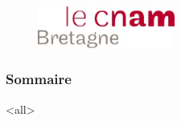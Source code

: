 \documentclass[ignorenonframetext, 8pt, allowframebreaks]{beamer}
\title[\ushorttitle]{\utitle}
\author[\uauthortwitter]{ \uauthor \\ \medskip {\small \url{\umaila} \and \url{\umailb}\\ {\small \url{\usitea}}}}
\institute[\uinstituteshort]{\uinstitute \\ \uchaire}
\date[\uversion]{Date de publication\\ \today}
\begin{document}
\begin{frame}[plain]

 					\begin{figure}
  					 \centering
   						 \includegraphics[width=0.4\textwidth]{../Tex/template.inc/Commons/CommonsPictures/cnambretagne.pdf}\\
				  \end{figure}

				  				\titlepage
\end{frame}
\begin{frame}
 \frametitle{Sommaire}
 \tableofcontents
 \end{frame}
 
\mode<all>{\ubody}


\end{document}
